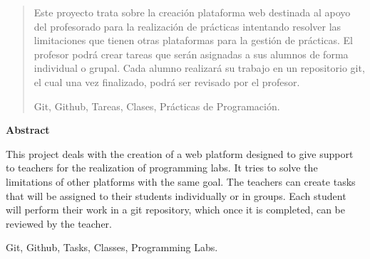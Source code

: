 \documentclass[spanish,a4paper,14pt,oneside]{extreport}
\newenvironment{summary}
{\par\noindent\begin{center}\textbf{Abstract}\end{center}\begin{itshape}\par\noindent}
{\end{itshape}}
\newenvironment{keywords}
{\begin{list}{}{\setlength{\leftmargin}{1em}}\item[\hskip\labelsep \bfseries Keywords:]}
{\end{list}}
\newenvironment{palabrasClave}
{\begin{list}{}{\setlength{\leftmargin}{1em}}\item[\hskip\labelsep \bfseries Palabras clave:]}
{\end{list}}
\begin{document}
\newpage  %
\begin{abstract}
{\em

Este proyecto trata sobre la creación plataforma web destinada al apoyo del profesorado para la realización de prácticas 
intentando resolver las limitaciones que tienen otras plataformas para la gestión de prácticas. 
El profesor podrá crear tareas que serán asignadas a sus alumnos de forma individual o grupal. 
Cada alumno realizará su trabajo en un repositorio git, el cual una vez finalizado, podrá ser revisado por el profesor.

}

\begin{palabrasClave}
Git, Github, Tareas, Clases, Prácticas de Programación.
\end{palabrasClave}

\end{abstract}

\newpage  %
\begin{summary}
{\em

This project deals with the creation of a web platform designed to give support to teachers for the realization
of programming labs. 
It tries to solve the limitations of  other platforms with the same goal. 
The teachers can create tasks that will be assigned to their students individually or in
groups. Each student will perform their work in a git repository, which once it is completed, can be reviewed by the teacher.
}

\begin{keywords}
Git, Github, Tasks, Classes, Programming Labs.
\end{keywords}

\end{summary}

\newpage{\pagestyle{empty}}
\thispagestyle{empty}



\pagestyle{myheadings} %
\end{document}
